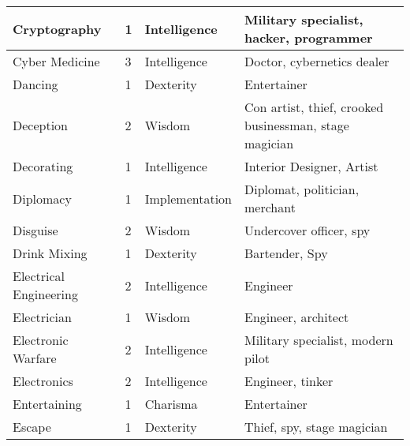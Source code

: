 \documentclass[twoside]{book}
\begin{document}
\begin{longtable}{p{1.25in}llp{12em}}
  \tabularnewline
  \hline
      
  \raggedright
           Cryptography 
  &
   1 
  &
   Intelligence 
  &
   Military specialist,
           hacker, programmer 
  \tabularnewline
  \hline
      
  \raggedright
           Cyber Medicine 
  &
   3 
  &
   Intelligence 
  &
   Doctor, cybernetics
           dealer 
  \tabularnewline
  \hline
      
  \raggedright
           Dancing 
  &
   1 
  &
   Dexterity 
  &
   Entertainer 
  \tabularnewline
  \hline
      
  \raggedright
           Deception 
  &
   2 
  &
   Wisdom 
  &
   Con artist, thief,
           crooked businessman, stage magician 
  \tabularnewline
  \hline
      
  \raggedright
           Decorating 
  &
   1 
  &
   Intelligence 
  &
   Interior Designer, Artist
           
  \tabularnewline
  \hline
      
  \raggedright
           Diplomacy 
  &
   1 
  &
   Implementation 
  &
   Diplomat, politician,
           merchant 
  \tabularnewline
  \hline
      
  \raggedright
           Disguise 
  &
   2 
  &
   Wisdom 
  &
   Undercover officer, spy
           
  \tabularnewline
  \hline
      
  \raggedright
           Drink Mixing 
  &
   1 
  &
   Dexterity 
  &
   Bartender, Spy 
  \tabularnewline
  \hline
      
  \raggedright
           Electrical Engineering 
  &
   2 
  &
   Intelligence 
  &
   Engineer 
  \tabularnewline
  \hline
      
  \raggedright
           Electrician 
  &
   1 
  &
   Wisdom 
  &
   Engineer, architect
           
  \tabularnewline
  \hline
      
  \raggedright
           Electronic Warfare 
  &
   2 
  &
   Intelligence 
  &
   Military specialist,
           modern pilot 
  \tabularnewline
  \hline
      
  \raggedright
           Electronics 
  &
   2 
  &
   Intelligence 
  &
   Engineer, tinker 
  \tabularnewline
  \hline
      
  \raggedright
           Entertaining 
  &
   1 
  &
   Charisma 
  &
   Entertainer 
  \tabularnewline
  \hline
      
  \raggedright
           Escape 
  &
   1 
  &
   Dexterity 
  &
   Thief, spy, stage
           magician 
  \tabularnewline
  \hline
      

\end{longtable}
\end{document}
